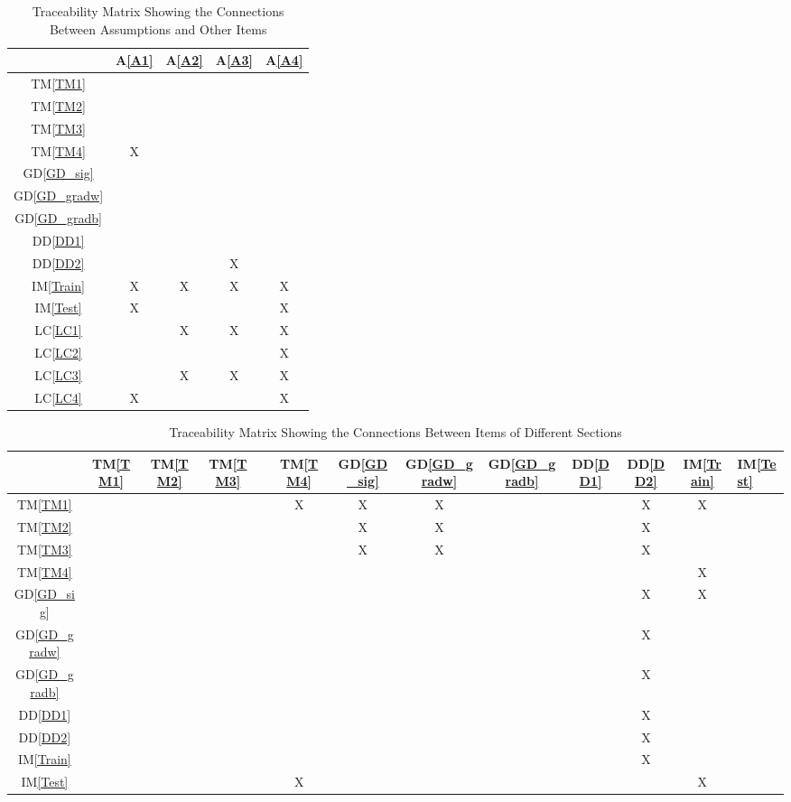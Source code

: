 \documentclass[12pt]{article}
\newcommand{\dref}[1]{GD\ref{#1}}
\newcommand{\ddref}[1]{DD\ref{#1}}
\newcommand{\tref}[1]{TM\ref{#1}}
\newcommand{\aref}[1]{A\ref{#1}}
\newcommand{\iref}[1]{IM\ref{#1}}
\newcommand{\lcref}[1]{LC\ref{#1}}
\begin{document}
\begin{table}[h!]
\centering
\begin{tabular}{|c|c|c|c|c|}
\hline
	& \aref{A1}& \aref{A2}& \aref{A3}& \aref{A4} \\
\hline
\tref{TM1}        & & & &  \\ \hline
\tref{TM2}        & & & &  \\ \hline
\tref{TM3}        & & & & \\ \hline
\tref{TM4}        &X& & & \\ \hline
\dref{GD_sig}        & & & &  \\ \hline
\dref{GD_gradw}        & & & & \\ \hline
\dref{GD_gradb}       & & & & \\ \hline
\ddref{DD1}       & & & &  \\ \hline
\ddref{DD2}       & & & X &  \\ \hline
\iref{Train}       & X & X & X & X \\ \hline
\iref{Test}        & X & & & X \\ \hline
\lcref{LC1}        & & X & X & X \\ \hline
\lcref{LC2}        & & & & X \\ \hline
\lcref{LC3}        & & X & X & X \\ \hline
\lcref{LC4}       & X & & & X \\
\hline
\end{tabular}
\caption{Traceability Matrix Showing the Connections Between Assumptions and Other Items}
\label{Table:A_trace}
\end{table}

\begin{table}[h!]
\centering
\begin{tabular}{|c|c|c|c|c|c|c|c|c|c|c|c|}
\hline        
	& \tref{TM1}& \tref{TM2}& \tref{TM3}& & \tref{TM4}& \dref{GD_sig}& \dref{GD_gradw} & \dref{GD_gradb}& \ddref{DD1} & \ddref{DD2}& \iref{Train}& \iref{Test}\\
\hline
\tref{TM1}        & & & & &X&X&X& & &X&X\\ \hline
\tref{TM2}        & & & & & &X&X& & &X& \\ \hline
\tref{TM3}        & & & & & &X&X& & &X&  \\ \hline
\tref{TM4}        & & & & & & & & & & &X \\ \hline
\dref{GD_sig}     & & & & & & & & & &X&X \\ \hline
\dref{GD_gradw}   & & & & & & & & & &X&  \\ \hline
\dref{GD_gradb}   & & & & & & & & & &X&  \\ \hline
\ddref{DD1}       & & & & & & & & & &X&  \\ \hline
\ddref{DD2}       & & & & & & & & & &X&  \\ \hline
\iref{Train}      & & & & & & & & & &X&  \\ \hline
\iref{Test}       & & & & &X& & & & & &X \\ 
\hline
\end{tabular}
\caption{Traceability Matrix Showing the Connections Between Items of Different Sections}
\label{Table:trace}
\end{table}
\end{document}
